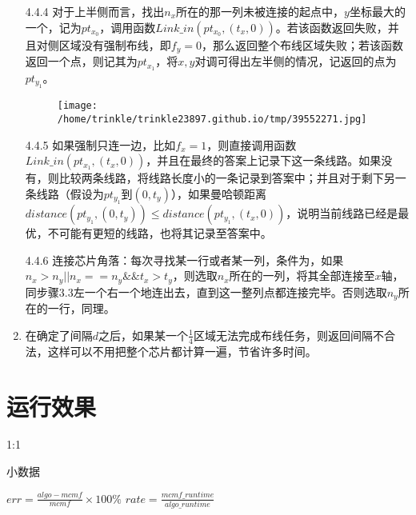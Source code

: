 \documentclass[]{article}
\begin{document}
\begin{enumerate}
   4.4.4
  对于上半侧而言，找出\(n_x\)所在的那一列未被连接的起点中，\(y\)坐标最大的一个，记为\(pt_{x_0}\)，调用函数\(Link\_in(pt_{x_0},(t_x,0))\)。若该函数返回失败，并且对侧区域没有强制布线，即\(f_y=0\)，那么返回整个布线区域失败；若该函数返回一个点，则记其为\(pt_{x_1}\)，将\(x,y\)对调可得出左半侧的情况，记返回的点为\(pt_{y_1}\)。

  \begin{figure}[htbp]
  \centering
  \texttt{[image: /home/trinkle/trinkle23897.github.io/tmp/39552271.jpg]}
  \caption{}
  \end{figure}

   4.4.5
  如果强制只连一边，比如\(f_x=1\)，则直接调用函数\(Link\_in(pt_{x_1},(t_x,0))\)，并且在最终的答案上记录下这一条线路。如果没有，则比较两条线路，将线路长度小的一条记录到答案中；并且对于剩下另一条线路（假设为\(pt_{y_1}\)到\((0,t_y)\)），如果曼哈顿距离\(distance(pt_{y_1},(0,t_y))\le distance(pt_{y_1},(t_x,0))\)，说明当前线路已经是最优，不可能有更短的线路，也将其记录至答案中。

   4.4.6
  连接芯片角落：每次寻找某一行或者某一列，条件为，如果\(n_x>n_y||n_x==n_y\&\&t_x>t_y\)，则选取\(n_x\)所在的一列，将其全部连接至\(x\)轴，同步骤3.3左一个右一个地连出去，直到这一整列点都连接完毕。否则选取\(n_y\)所在的一行，同理。
\item
  在确定了间隔\(d\)之后，如果某一个\(\frac{1}{4}\)区域无法完成布线任务，则返回间隔不合法，这样可以不用把整个芯片都计算一遍，节省许多时间。
\end{enumerate}

\section{运行效果}\label{header-n157}

1:1

小数据

\(err=\frac{algo-mcmf}{mcmf}\times 100\%\)
\(rate=\frac{mcmf\_runtime}{algo\_runtime}\)
\end{document}
